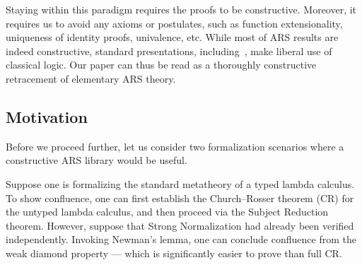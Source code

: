 Staying within this paradigm requires the proofs to be constructive.
Moreover, it requires us to avoid any axioms or postulates, such as function
extensionality, uniqueness of identity proofs, univalence, etc.
While most of ARS results are indeed constructive, standard presentations,
 including~\cite{Terese}, make liberal use of classical logic.
Our paper can thus be read as a thoroughly constructive
retracement of elementary ARS theory.

\subsection{Motivation}

Before we proceed further, let us consider two formalization scenarios where
a constructive ARS library would be useful.

\begin{example}
Suppose one is formalizing the standard metatheory of
a typed lambda calculus.  To show confluence, one can
first establish the Church--Rosser theorem (CR) for the untyped lambda calculus,
and then proceed via the Subject Reduction theorem.
However, suppose that Strong Normalization had already been verified independently.
Invoking Newman's lemma, one can conclude confluence from the weak
diamond property --- which is significantly easier to prove than full CR.
\end{example}

